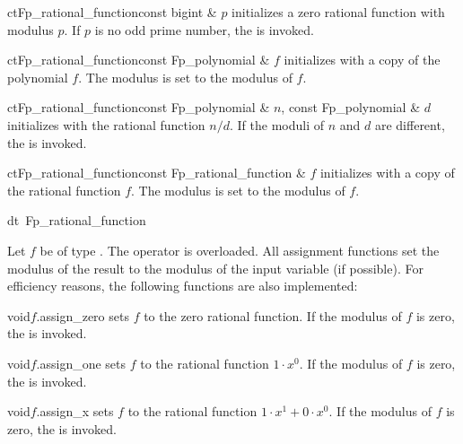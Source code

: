 \begin{fcode}{ct}{Fp_rational_function}{const bigint & $p$}
  initializes a zero rational function with modulus $p$.  If $p$ is no odd prime number, the
  \LEH is invoked.
\end{fcode}

\begin{fcode}{ct}{Fp_rational_function}{const Fp_polynomial & $f$}
  initializes with a copy of the polynomial $f$.  The modulus is set to the modulus of $f$.
\end{fcode}

\begin{fcode}{ct}{Fp_rational_function}{const Fp_polynomial & $n$, const Fp_polynomial & $d$}
  initializes with the rational function $n / d$.  If the moduli of $n$ and $d$ are different,
  the \LEH is invoked.
\end{fcode}

\begin{fcode}{ct}{Fp_rational_function}{const Fp_rational_function & $f$}
  initializes with a copy of the rational function $f$.  The modulus is set to the modulus of
  $f$.
\end{fcode}

\begin{fcode}{dt}{~Fp_rational_function}{}
\end{fcode}



\ASGN

Let $f$ be of type .  The operator \code{=} is overloaded.  All
assignment functions set the modulus of the result to the modulus of the input variable (if
possible).  For efficiency reasons, the following functions are also implemented:

\begin{fcode}{void}{$f$.assign_zero}{}
  sets $f$ to the zero rational function.  If the modulus of $f$ is zero, the \LEH is invoked.
\end{fcode}

\begin{fcode}{void}{$f$.assign_one}{}
  sets $f$ to the rational function $1 \cdot x^0$.  If the modulus of $f$ is zero, the \LEH is
  invoked.
\end{fcode}

\begin{fcode}{void}{$f$.assign_x}{}
  sets $f$ to the rational function $1 \cdot x^1+0 \cdot x^0$.  If the modulus of $f$ is zero,
  the \LEH is invoked.
\end{fcode}

